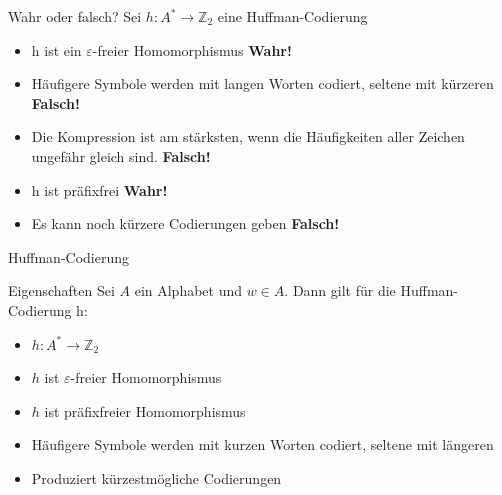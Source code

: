 \documentclass{beamer}
\begin{document}
\begin{frame}{Wahr oder falsch?}
	Sei $h: A^* \rightarrow \mathbb{Z}_2$ eine Huffman-Codierung
	\begin{itemize}
		\item h ist ein $\varepsilon$-freier Homomorphismus \pause \textbf{Wahr!}\pause
		\item Häufigere Symbole werden mit langen Worten codiert, seltene mit kürzeren \pause \textbf{Falsch!}\pause
		\item Die Kompression ist am stärksten, wenn die Häufigkeiten aller Zeichen ungefähr gleich sind. \pause \textbf{Falsch!} \pause
		\item h ist präfixfrei \pause \textbf{Wahr!} \pause
		\item Es kann noch kürzere Codierungen geben \pause \textbf{Falsch!}
	\end{itemize}
\end{frame}

	
\begin{frame}{Huffman-Codierung}
	\begin{block}{Eigenschaften}
		Sei $A$ ein Alphabet und $w \in A$. Dann gilt für die Huffman-Codierung h:
		\begin{itemize}
			\item $h: A^* \rightarrow \mathbb{Z}_2$
			\item $h$ ist $\varepsilon$-freier Homomorphismus
			\item $h$ ist präfixfreier Homomorphismus
			\item Häufigere Symbole werden mit kurzen Worten codiert, seltene mit längeren
			\item Produziert kürzestmögliche Codierungen
		\end{itemize}
	\end{block}
\end{frame}
\end{document}

